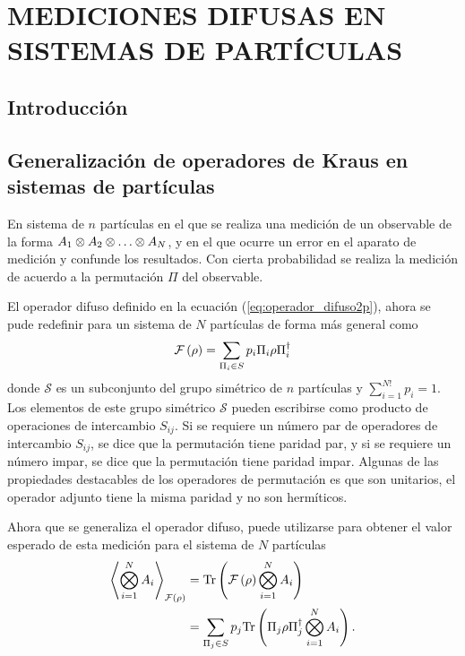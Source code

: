 \chapter{ MEDICIONES DIFUSAS EN SISTEMAS DE \texorpdfstring{}{N} PARTÍCULAS}
\section{ Introducción}

















\section{Generalización de operadores de Kraus en sistemas de \texorpdfstring{}{N} partículas}



En sistema de $n$ partículas en el que se realiza una medición de un observable de la forma $A_1\otimes A_2\otimes \hdots \otimes A_N$, y en el que ocurre un error en el aparato de medición y confunde los resultados. Con cierta probabilidad se realiza la medición de acuerdo a la permutación $\Pi$ del observable. 

El operador difuso definido en la ecuación ({\ref{eq:operador_difuso2p}}), ahora se pude redefinir para un sistema de $N$ partículas de forma más general como\begin{equation}\label{eq:fm-nparticles}
   \mathcal{F}\left(\rho\right)=\sum_{\Pi_i\in S}p_{i}\Pi_{i}\rho\Pi_{i}^{\dagger}
\end{equation}donde $\mathcal{S}$ es un subconjunto del grupo simétrico de $n$ partículas y $\sum_{i=1}^{N!} p_i=1$.  Los elementos de este grupo simétrico $\mathcal{S}$ pueden escribirse como producto de operaciones de intercambio $S_{ij}$. Si se requiere un número par de operadores de intercambio $S_{ij}$, se dice que la permutación tiene paridad par, y si se requiere un número impar, se dice que la permutación tiene paridad impar. Algunas de las propiedades destacables de los operadores de permutación es que son unitarios, el operador adjunto tiene la misma paridad y no son hermíticos.

Ahora que se generaliza el operador difuso, puede utilizarse para obtener el valor esperado de esta medición para el sistema de $N$ partículas {\cite{Pineda_2021}}\begin{equation}\label{eq:ExpectedValue-generalForm}\begin{split}
    \left \langle \bigotimes_{i=1}^{N} A_i\right \rangle_{\mathcal{F}(\rho)} &={\rm Tr}\left(\mathcal{F}\left(\rho\right)\bigotimes_{i=1}^{N} A_i\right)\\
    &=\sum_{\Pi_j \in S}p_{j}{\rm Tr} \left(\Pi_{j}\rho\Pi_{j}^{\dagger} \bigotimes_{i=1}^{N} A_i\right).
\end{split}
\end{equation} 

